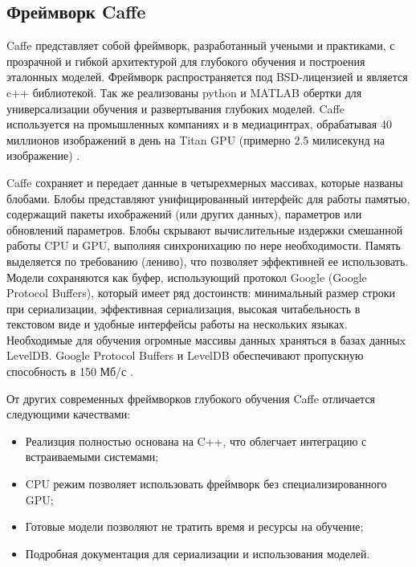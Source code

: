 \documentclass[a4paper,english,russian]{G2-105}
\begin{document}
\subsection{Фреймворк Caffe}
\par Caffe представляет собой фреймворк, разработанный учеными и практиками, с прозрачной и гибкой архитектурой для глубокого обучения и построения эталонных моделей. Фреймворк распространяется под BSD-лицензией и является c++ библиотекой. Так же реализованы python и MATLAB обертки для универсализации обучения и развертывания глубоких моделей. Caffe используется на промышленных компаниях и в медиацинтрах, обрабатывая 40 миллионов изображений в день на Titan GPU (примерно 2.5 милисекунд на изображение) \cite{11}.
\par Caffe сохраняет и передает данные в четырехмерных массивах, которые названы блобами. Блобы представляют унифицированный интерфейс для работы  памятью, содержащий пакеты ихображений (или других данных), параметров или обновлений параметров. Блобы скрывают вычислительные издержки смешанной работы CPU и GPU, выполняя синхронихацию по нере необходимости. Память выделяется по требованию (лениво), что позволяет эффективней ее использовать. Модели сохраняются как буфер, использующий протокол Google (Google Protocol Buffers), который имеет ряд достоинств: минимальный размер строки при сериализации, эффективная сериализация, высокая читабельность в текстовом виде и удобные интерфейсы работы на нескольких языках. Необходимые для обучения огромные массивы данных храняться в базах данныx LevelDB. Google Protocol Buffers и LevelDB обеспечивают пропускную способность в 150 Мб/с \cite{12}.
\par От других современных фреймворков глубокого обучения Caffe отличается следующими качествами:
\begin{itemize}
	\item Реализция полностью основана на C++, что облегчает интеграцию с встраиваемыми системами;
	\item CPU режим позволяет использовать фреймворк без специализированного GPU;
	\item Готовые модели позволяют не тратить время и ресурсы на обучение;
	\item Подробная документация для сериализации и использования моделей.
\end{itemize}
\end{document}
